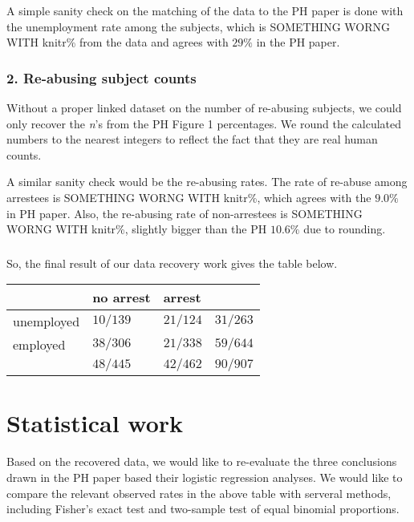 \documentclass{article}
\newcommand{\rinline}[1]{SOMETHING WORNG WITH knitr}
\begin{document}
A simple sanity check on the matching of the data to the PH paper is
done with the unemployment rate among the subjects, which is 
\rinline{rowSums(N.tbl)[1] / sum(sum(N.tbl)) * 100}\% from the data and
agrees with $29\%$ in the PH paper.


\subsubsection*{2. Re-abusing subject counts}
\hspace{12 pt} Without a proper linked dataset on the number of
re-abusing subjects, we could only recover the \textit{n}'s from the
PH Figure 1 percentages. We round the calculated numbers to the nearest integers to
reflect the fact that they are real human counts.


A similar sanity check would be the re-abusing rates. The rate of
re-abuse among arrestees is \rinline{colSums(n.tbl)[2] / colSums(N.tbl)[2] * 100}\%,
which agrees with the $9.0\%$ in PH paper. Also, the re-abusing rate of
non-arrestees is \rinline{colSums(n.tbl)[1] / colSums(N.tbl)[1] * 100}\%,  
slightly bigger than the PH $10.6\%$ due to rounding.


\subsubsection*{}
So, the final result of our data recovery work gives the table below.

\begin{center}
\begin{tabular}{l|l|l|l}
                    & no arrest     & arrest          & \\ \hline
unemployed & {$10/139$} & {$21/124$} & {$31/263$}\\ \hline
employed     & {$38/306$} & {$21/338$} & {$59/644$}\\ \hline
                    & {$48/445$} & {$42/462$} & {$90/907$}\\ 
\end{tabular}
\end{center}




\newpage
\section*{Statistical work}
\hspace{12 pt} Based on the recovered data, we would like to
re-evaluate the three conclusions drawn in the PH paper based their
logistic regression analyses. We would like to compare the relevant
observed rates in the above table with serveral methods, including
Fisher's exact test and two-sample test of equal binomial proportions.
\end{document}
